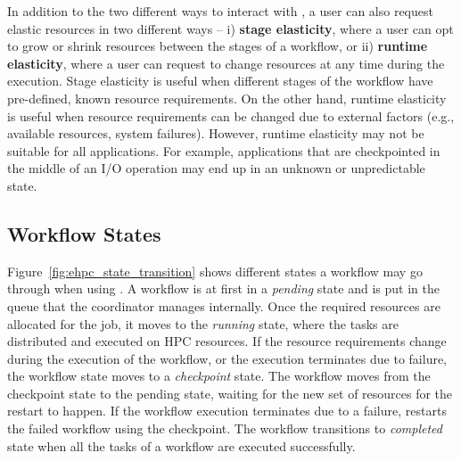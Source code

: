 In addition to the two different ways to interact with \systemname, a
user can also request elastic resources in two different ways -- i)
\textbf{stage elasticity}, where a user can opt to grow or shrink
resources between the stages of a workflow, or ii) \textbf{runtime
  elasticity}, where a user can request to change resources at any
time during the execution. Stage elasticity is useful when different
stages of the workflow have pre-defined, known resource
requirements. On the other hand, runtime elasticity is useful when
resource requirements can be changed due to external factors (e.g.,
available resources, system failures). However, runtime elasticity may
not be suitable for all applications. For example,
applications that are checkpointed in the middle of an I/O operation
may end up in an unknown or unpredictable state.

\vspace{-0.3cm}
\subsection{Workflow States}



Figure~\ref{fig:ehpc_state_transition} shows different states a
workflow may go through when using \systemname. A workflow is
at first in a \emph{pending} state
and is put in the queue that the \systemname coordinator manages
internally. Once the required resources are allocated for the job, it
moves to the \emph{running} state, where the tasks are distributed and
executed on HPC resources. If the resource requirements change during
the execution of the workflow, or the execution terminates due to
failure, the workflow state moves to a \emph{checkpoint} state.
The workflow moves from the checkpoint state to the pending state,
waiting for the new set of resources for the restart to happen. If
the workflow execution terminates due to a failure, \systemname
restarts the failed workflow using the checkpoint. The workflow
transitions to \emph{completed} state when all the tasks of a workflow
are executed successfully.

